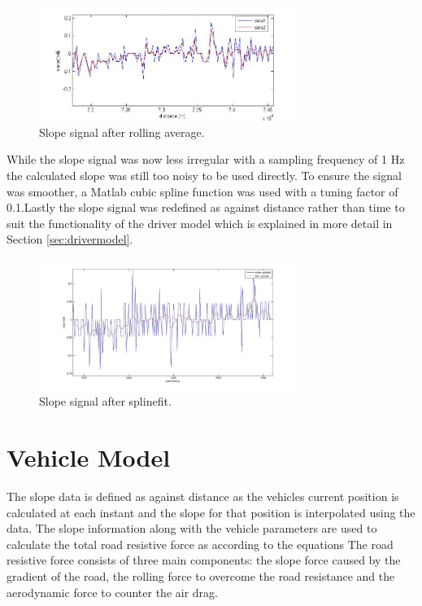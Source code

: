 \documentclass[ExampleMasters.tex]{subfiles}
\begin{document}
\begin{figure}
	\begin{center}
		\includegraphics[width=0.75\textwidth]{figures/VehicleModel/rollingavg.jpg}
	\end{center}
	\caption{Slope signal after rolling average.}
	\label{fig:rollingavg}
\end{figure}

While the slope signal was now less irregular with a sampling frequency of 1 Hz the calculated slope was still too noisy to be used directly. To ensure the signal was smoother, a Matlab cubic spline function was used with a tuning factor of 0.1.Lastly the slope signal was redefined as against distance rather than time to suit the functionality of the driver model which is explained in more detail in Section  \ref{sec:drivermodel}.

\begin{figure}
	\begin{center}
		\includegraphics[width=0.75\textwidth]{figures/VehicleModel/aftersplinefit.jpg}
	\end{center}
	\caption{Slope signal after splinefit.}
	\label{fig:aftersplinefit}
\end{figure}

\section{Vehicle Model}
\label{sec:vehiclemodel}
The slope data is defined as against distance as the vehicles current position is calculated at each instant and the slope for that position is interpolated using the data. The slope information along with the vehicle parameters are used to calculate the total road resistive force as according to the equations %
The road resistive force consists of three main components: the slope force caused by the gradient of the road, the rolling force to overcome the road resistance and the aerodynamic force to counter the air drag.
\end{document}
